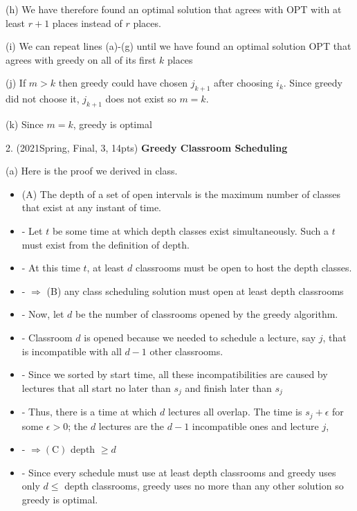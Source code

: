 \begin{spacing}{1.3}
    (h) We have therefore found an optimal solution that agrees with OPT with at least $r+1$ places instead of $r$ places.
    
    (i) We can repeat lines (a)-(g) until we have found an optimal solution OPT that agrees with greedy on all of its first $k$ places
    
    (j) If $m>k$ then greedy could have chosen $j_{k+1}$ after choosing $i_{k}$. Since greedy did not choose it, $j_{k+1}$ does not exist so $m=k$.
    
    (k) Since $m=k$, greedy is optimal

    \setlength{\parindent}{0em}

    \vspace{0.5in}
    2. (2021Spring, Final, 3, 14pts) {\bf Greedy Classroom Scheduling} 

    (a) Here is the proof we derived in class.
    \begin{itemize}
        \item (A) The depth of a set of open intervals is the maximum number of classes that exist at any instant of time.
        \item  - Let $t$ be some time at which depth classes exist simultaneously. Such a $t$ must exist from the definition of depth.
        \item  - At this time $t$, at least $d$ classrooms must be open to host the depth classes.
        \item  - $\Rightarrow$ (B) any class scheduling solution must open at least depth classrooms
        \item - Now, let $d$ be the number of classrooms opened by the greedy algorithm.
        \item - Classroom $d$ is opened because we needed to schedule a lecture, say $j$, that is incompatible with all $d-1$ other classrooms.
        \item - Since we sorted by start time, all these incompatibilities are caused by lectures that all start no later than $s_{j}$ and finish later than $s_{j}$
        \item - Thus, there is a time at which $d$ lectures all overlap. The time is $s_{j}+\epsilon$ for some $\epsilon>0$; the $d$ lectures are the $d-1$ incompatible ones and lecture $j$,
        \item - $\Rightarrow(\mathrm{C})$ depth $\geq d$
        \item - Since every schedule must use at least depth classrooms and greedy uses only $d \leq$ depth classrooms, greedy uses no more than any other solution so greedy is optimal.
    \end{itemize}


\end{spacing}

